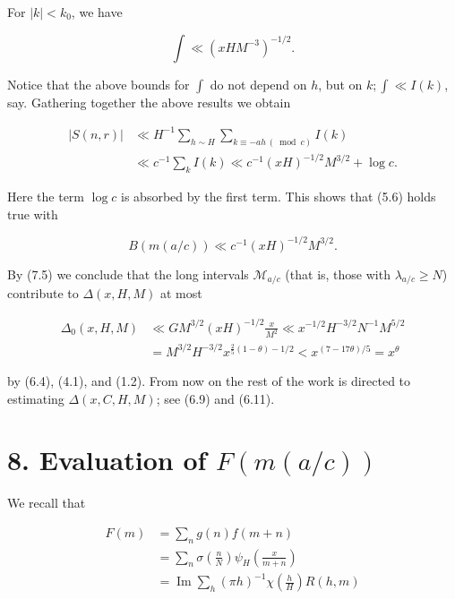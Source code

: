 \documentclass[10pt]{article}
\begin{document}
For $|k|<k_{0}$, we have


\begin{equation*}
\int \ll\left(x H M^{-3}\right)^{-1 / 2} . \tag{7.4}
\end{equation*}


Notice that the above bounds for $\int$ do not depend on $h$, but on $k ; \int \ll I(k)$, say. Gathering together the above results we obtain

$$
\begin{aligned}
|S(n,r)| & \ll H^{-1} \sum_{h \sim H} \sum_{k \equiv-a h\, (\bmod c)} I(k) \\
& \ll c^{-1} \sum_{k} I(k) \ll c^{-1}(x H)^{-1 / 2} M^{3 / 2}+\log c .
\end{aligned}
$$

Here the term $\log c$ is absorbed by the first term. This shows that (5.6) holds true with


\begin{equation*}
B(m(a / c)) \ll c^{-1}(x H)^{-1 / 2} M^{3 / 2} . \tag{7.5}
\end{equation*}


By (7.5) we conclude that the long intervals $\mathscr{M}_{a / c}$ (that is, those with $\lambda_{a / c} \geqslant N$) contribute to $\Delta(x, H, M)$ at most


\begin{align*}
\Delta_{0}(x,H,M) & \ll G M^{3 / 2}(x H)^{-1 / 2} \frac{x}{M^{2}} \ll x^{-1 / 2} H^{-3 / 2} N^{-1} M^{5 / 2} \\
& =M^{3 / 2} H^{-3 / 2} x^{\frac{2}{5}(1-\theta)-1 / 2}<x^{(7-17 \theta) / 5}=x^{\theta} \tag{7.6}
\end{align*}


by (6.4), (4.1), and (1.2).
From now on the rest of the work is directed to estimating $\Delta(x, C, H, M)$; see (6.9) and (6.11).

\section*{8. Evaluation of $F(m(a / c))$}
We recall that

$$
\begin{aligned}
F(m) & =\sum_{n} g(n) f(m+n) \\
& =\sum_{n} \sigma\left(\frac{n}{N}\right) \psi_{H}\left(\frac{x}{m+n}\right) \\
& =\operatorname{Im}\sum_{h}(\pi h)^{-1} \chi\left(\frac{h}{H}\right) R(h, m)
\end{aligned}
$$
\end{document}
